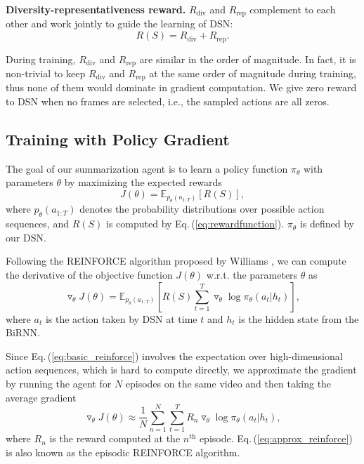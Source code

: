 \documentclass[letterpaper]{article} \usepackage{aaai18}  \usepackage{times}  \usepackage{helvet}  \usepackage{courier}  \usepackage{url}  \usepackage{graphicx}
\begin{document}
{\bf Diversity-representativeness reward.} $R_\text{div}$ and $R_\text{rep}$ complement to each other and work jointly to guide the learning of DSN:
\begin{equation} \label{eq:rewardfunction}
R(S) = R_\text{div} + R_\text{rep}.
\end{equation}

During training, $R_\text{div}$ and $R_\text{rep}$ are similar in the order of magnitude. In fact, it is non-trivial to keep $R_\text{div}$ and $R_\text{rep}$ at the same order of magnitude during training, thus none of them would dominate in gradient computation. We give zero reward to DSN when no frames are selected, i.e., the sampled actions are all zeros.

\subsection{Training with Policy Gradient}
The goal of our summarization agent is to learn a policy function $\pi_\theta$ with parameters $\theta$ by maximizing the expected rewards
\begin{equation}
J (\theta) = \mathbb{E}_{p_\theta (a_{1:T})} [R (S)],
\end{equation}
where $p_\theta (a_{1:T})$ denotes the probability distributions over possible action sequences, and $R(S)$ is computed by Eq.\,(\ref{eq:rewardfunction}). $\pi_\theta$ is defined by our DSN.

Following the REINFORCE algorithm proposed by Williams \cite{williams1992simple}, we can compute the derivative of the objective function $J (\theta)$ w.r.t. the parameters $\theta$ as
\begin{equation} \label{eq:basic_reinforce}
\triangledown_\theta J (\theta) = \mathbb{E}_{p_\theta (a_{1:T})} [R (S) \sum_{t=1}^T \triangledown_\theta \log \pi_\theta (a_t | h_t)],
\end{equation}
where $a_t$ is the action taken by DSN at time $t$ and $h_t$ is the hidden state from the BiRNN.

Since Eq.\,(\ref{eq:basic_reinforce}) involves the expectation over high-dimensional action sequences, which is hard to compute directly, we approximate the gradient by running the agent for $N$ episodes on the same video and then taking the average gradient
\begin{equation} \label{eq:approx_reinforce}
\triangledown_\theta J (\theta) \approx \frac{1}{N} \sum_{n=1}^N \sum_{t=1}^T R_n \triangledown_\theta \log \pi_\theta (a_t | h_t),
\end{equation}
where $R_n$ is the reward computed at the $n^{\text{th}}$ episode. Eq.\,(\ref{eq:approx_reinforce}) is also known as the episodic REINFORCE algorithm.
\end{document}
